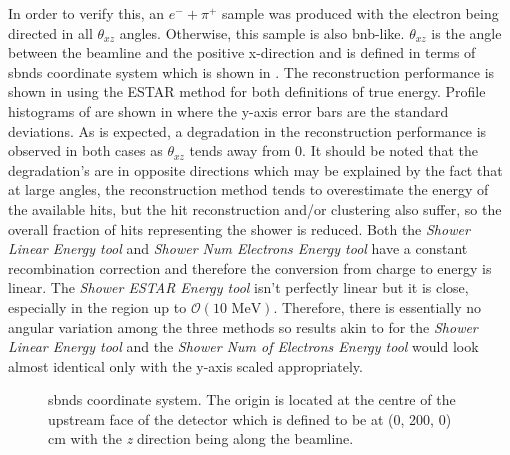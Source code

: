In order to verify this, an  $e^- + \pi^+$ sample was produced with the electron being directed in all $\theta_{xz}$ angles. Otherwise, this sample is also \gls{bnb}-like. $\theta_{xz}$ is the angle between the beamline and the positive x-direction and is defined in terms of \glspl{sbnd} coordinate system which is shown in . The reconstruction performance is shown in  using the ESTAR method for both definitions of true energy. Profile histograms of  are shown in  where the y-axis error bars are the standard deviations. As is expected, a degradation in the reconstruction performance is observed in both cases as $\theta_{xz}$ tends away from 0. It should be noted that the degradation's are in opposite directions which may be explained by the fact that at large angles, the reconstruction method tends to overestimate the energy of the available hits, but the hit reconstruction and/or clustering also suffer, so the overall fraction of hits representing the shower is reduced. Both the \textit{Shower Linear Energy tool} and \textit{Shower Num Electrons Energy tool} have a constant recombination correction and therefore the conversion from charge to energy is linear. The \textit{Shower ESTAR Energy tool} isn't perfectly linear but it is close, especially in the region up to $\mathcal{O}(10 \text{ MeV})$. Therefore, there is essentially no angular variation among the three methods so results akin to  for the \textit{Shower Linear Energy tool} and the \textit{Shower Num of Electrons Energy tool} would look almost identical only with the y-axis scaled appropriately. 
\begin{figure}[h!]
    \centering
    

    \caption[\glspl{sbnd} coordinate system.]{\glspl{sbnd} coordinate system. The origin is located at the centre of the upstream face of the detector which is defined to be at (0, 200, 0) cm with the \textit{z} direction being along the beamline.}
    \label{fig:sbnd_coordinate_system}
\end{figure}


